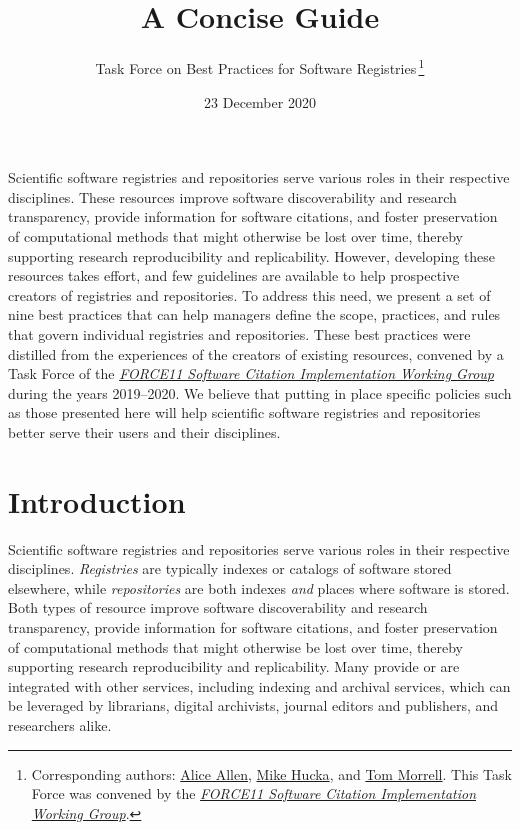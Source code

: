\documentclass[11pt]{article}
\title{\textls[-27]{Nine Best Practices for Research Software Registries and Repositories:}\\
A Concise Guide}
\date{23 December 2020}
\author{Task Force on Best Practices for Software Registries$\,$\footnote{Corresponding authors: \href{mailto:aallen@ascl.net}{Alice Allen}, \href{mailto:mhucka@caltech.edu}{Mike Hucka}, and \href{mailto:tmorrell@library.caltech.edu}{Tom Morrell}.\newline
This Task Force was convened by the \href{https://github.com/force11/force11-sciwg}{\emph{FORCE11 Software Citation Implementation Working Group}}.}}
\begin{document}
\maketitle
\thispagestyle{empty} %

{\small\vspace*{-10pt} Scientific software registries and repositories serve various roles in their respective disciplines. These resources improve software discoverability and research transparency, provide information for software citations, and foster preservation of computational methods that might otherwise be lost over time, thereby supporting research reproducibility and replicability. However, developing these resources takes effort, and few guidelines are available to help prospective creators of registries and repositories. To address this need, we present a set of nine best practices that can help managers define the scope, practices, and rules that govern individual registries and repositories. These best practices were distilled from the experiences of the creators of existing resources, convened by a Task Force of the \href{https://github.com/force11/force11-sciwg}{\emph{FORCE11 Software Citation Implementation Working Group}} during the years 2019--2020. We believe that putting in place specific policies such as those presented here will help scientific software registries and repositories better serve their users and their disciplines.}

\tableofcontents

\newcommand{\sectionbreak}{\clearpage}


\section{Introduction}
\label{introduction}

Scientific software registries and repositories serve various roles in their respective disciplines. \emph{Registries} are typically indexes or catalogs of software stored elsewhere, while \emph{repositories} are both indexes \emph{and} places where software is stored. Both types of resource improve software discoverability and research transparency, provide information for software citations, and foster preservation of computational methods that might otherwise be lost over time, thereby supporting research reproducibility and replicability. Many provide or are integrated with other services, including indexing and archival services, which can be leveraged by librarians, digital archivists, journal editors and publishers, and researchers alike.
\end{document}
